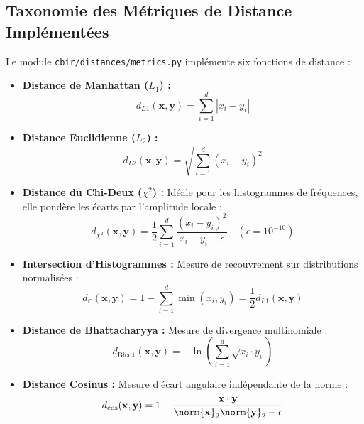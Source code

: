 \subsection{Taxonomie des Métriques de Distance Implémentées}
Le module \texttt{cbir/distances/metrics.py} implémente six fonctions de distance :
\begin{itemize}[nosep]
    \item \textbf{Distance de Manhattan ($L_1$) :}
    \begin{equation}
        d_{L1}(\mathbf{x}, \mathbf{y}) = \sum_{i=1}^{d} |x_i - y_i|
    \end{equation}
    \item \textbf{Distance Euclidienne ($L_2$) :}
    \begin{equation}
        d_{L2}(\mathbf{x}, \mathbf{y}) = \sqrt{ \sum_{i=1}^{d} (x_i - y_i)^2 }
    \end{equation}
    \item \textbf{Distance du Chi-Deux ($\chi^2$) :}
    Idéale pour les histogrammes de fréquences, elle pondère les écarts par l'amplitude locale :
    \begin{equation}
        d_{\chi^2}(\mathbf{x}, \mathbf{y}) = \frac{1}{2} \sum_{i=1}^{d} \frac{(x_i - y_i)^2}{x_i + y_i + \epsilon} \quad (\epsilon = 10^{-10})
    \end{equation}
    \item \textbf{Intersection d'Histogrammes :} Mesure de recouvrement sur distributions normalisées :
    \begin{equation}
        d_{\cap}(\mathbf{x}, \mathbf{y}) = 1 - \sum_{i=1}^{d} \min(x_i, y_i) = \frac{1}{2} d_{L1}(\mathbf{x}, \mathbf{y})
    \end{equation}
    \item \textbf{Distance de Bhattacharyya :} Mesure de divergence multinomiale :
    \begin{equation}
        d_{\text{Bhatt}}(\mathbf{x}, \mathbf{y}) = -\ln\left( \sum_{i=1}^{d} \sqrt{x_i \cdot y_i} \right)
    \end{equation}
    \item \textbf{Distance Cosinus :} Mesure d'écart angulaire indépendante de la norme :
    \begin{equation}
        d_{\cos}(\mathbf{x}, \mathbf{y}) = 1 - \frac{\mathbf{x} \cdot \mathbf{y}}{\norm{\mathbf{x}}_2 \norm{\mathbf{y}}_2 + \epsilon}
    \end{equation}
\end{itemize}

